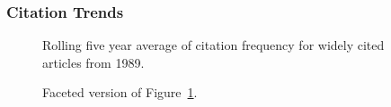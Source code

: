 \documentclass[
  10pt,
  letterpaper,
  DIV=11,
  numbers=noendperiod,
  twoside]{scrartcl}
\begin{document}
\subsubsection*{Citation Trends}\label{sec-trends-1989}

\begin{figure}


\caption{\label{fig-citation-spaghetti-1989}Rolling five year average of
citation frequency for widely cited articles from 1989.}

\end{figure}%

\begin{figure}


\caption{\label{fig-citation-facet-1989}Faceted version of
Figure~\ref{fig-citation-spaghetti-1989}.}

\end{figure}%
\end{document}
